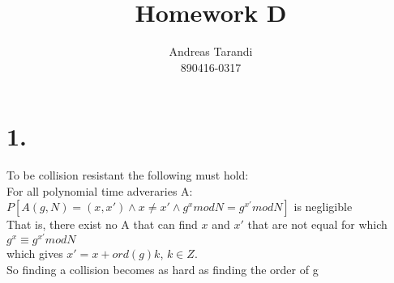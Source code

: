 \documentclass[a4paper,11pt]{article}
\author{Andreas Tarandi\\890416-0317}
\title{Homework D}
\begin{document}
	\maketitle

	\section*{1. }
		To be collision resistant the following must hold:\\
		For all polynomial time adveraries A:
		$P[A(g, N) = (x, x') \wedge x \neq x' \wedge g^x mod N = g^{x'} mod N]$ is negligible\\
		That is, there exist no A that can find $x$ and $x'$ that are not equal for which\\
		$g^x \equiv g^{x'} mod N$\\
		which gives $x' = x + ord(g)k$, $k \in Z$.\\
		So finding a collision becomes as hard as finding the order of g
\end{document}

